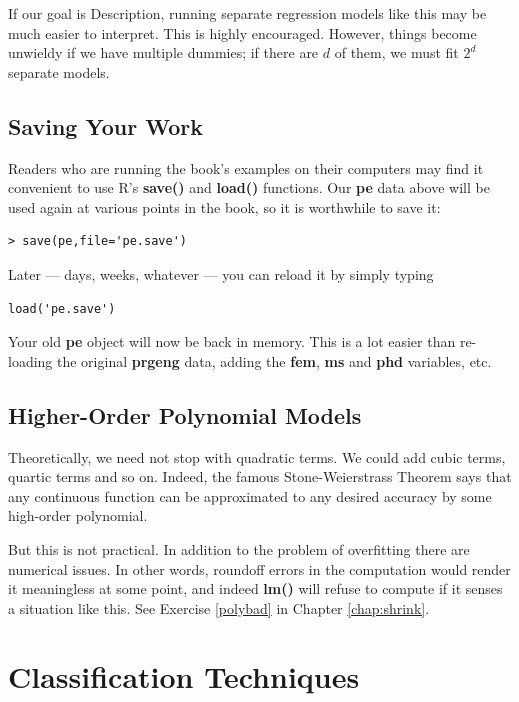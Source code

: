 If our goal is Description, running separate regression models like this
may be much easier to interpret.  This is highly encouraged.  However,
things become unwieldy if we have multiple dummies; if there are $d$ of
them, we must fit $2^d$ separate models.


\subsection{Saving Your Work}

Readers who are running the book's examples on their computers may find
it convenient to use R's {\bf save()} and {\bf load()} functions.  Our
{\bf pe} data above will be used again at various points in the book,
so it is worthwhile to save it:

\begin{lstlisting}
> save(pe,file='pe.save')
\end{lstlisting}

Later --- days, weeks, whatever --- you can reload it by simply typing

\begin{lstlisting}
load('pe.save')
\end{lstlisting}

Your old {\bf pe} object will now be back in memory.  This is a lot
easier than re-loading the original {\bf prgeng} data, adding the {\bf
fem}, {\bf ms} and {\bf phd} variables, etc.

\subsection{Higher-Order Polynomial Models}
\label{poly}

Theoretically, we need not stop with quadratic terms. We could add cubic
terms, quartic terms and so on.  Indeed, the famous Stone-Weierstrass
Theorem \cite{rudin} says that any continuous function can be
approximated to any desired accuracy by some high-order polynomial.

But this is not practical.  In addition to the problem of overfitting
there are numerical issues.  In other words, roundoff errors in the
computation would render it meaningless at some point, and indeed {\bf
lm()} will refuse to compute if it senses a situation like this.  See
Exercise \ref{polybad} in Chapter \ref{chap:shrink}.
 
\section{Classification Techniques}
\label{classtechs}

